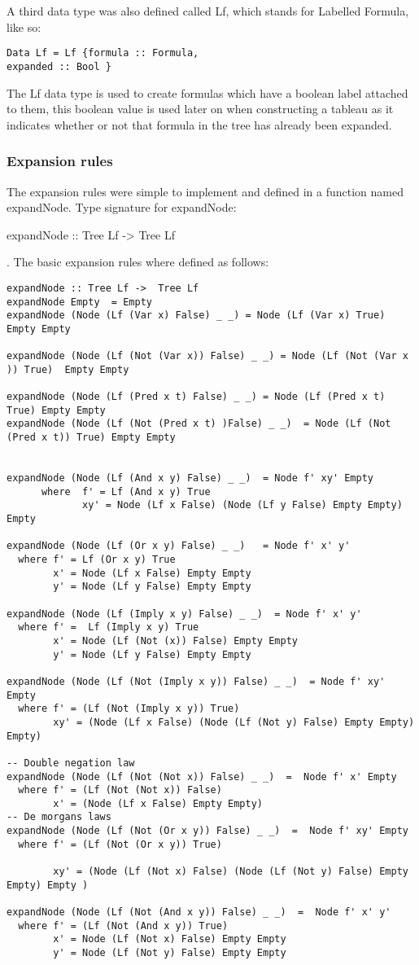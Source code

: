 \documentclass{article}%
\begin{document}
A third data type was also defined called Lf, which stands for Labelled Formula, like so: 
\begin{verbatim}
Data Lf = Lf {formula :: Formula, 
expanded :: Bool } 
\end{verbatim} 
The Lf data type is used to create formulas which have a boolean label attached to them, this boolean value is used later on when constructing a tableau as it indicates whether or not that formula in the tree has already been expanded. 
\subsubsection{Expansion rules}
The expansion rules were simple to implement and defined in a function named expandNode. Type signature for expandNode: \begin{myFunctionStyle} expandNode :: Tree Lf -> Tree Lf  \end{myFunctionStyle}.
The basic expansion rules where defined as follows: 
\begin{verbatim}
expandNode :: Tree Lf ->  Tree Lf 
expandNode Empty  = Empty 
expandNode (Node (Lf (Var x) False) _ _) = Node (Lf (Var x) True) Empty Empty 

expandNode (Node (Lf (Not (Var x)) False) _ _) = Node (Lf (Not (Var x )) True)  Empty Empty 

expandNode (Node (Lf (Pred x t) False) _ _) = Node (Lf (Pred x t) True) Empty Empty
expandNode (Node (Lf (Not (Pred x t) )False) _ _)  = Node (Lf (Not (Pred x t)) True) Empty Empty


expandNode (Node (Lf (And x y) False) _ _)  = Node f' xy' Empty 
      where  f' = Lf (And x y) True
             xy' = Node (Lf x False) (Node (Lf y False) Empty Empty) Empty
 
expandNode (Node (Lf (Or x y) False) _ _)   = Node f' x' y'
  where f' = Lf (Or x y) True
        x' = Node (Lf x False) Empty Empty
        y' = Node (Lf y False) Empty Empty

expandNode (Node (Lf (Imply x y) False) _ _)  = Node f' x' y'
  where f' =  Lf (Imply x y) True 
        x' = Node (Lf (Not (x)) False) Empty Empty
        y' = Node (Lf y False) Empty Empty 

expandNode (Node (Lf (Not (Imply x y)) False) _ _)  = Node f' xy' Empty 
  where f' = (Lf (Not (Imply x y)) True)
        xy' = (Node (Lf x False) (Node (Lf (Not y) False) Empty Empty) Empty)    

-- Double negation law
expandNode (Node (Lf (Not (Not x)) False) _ _)  =  Node f' x' Empty
  where f' = (Lf (Not (Not x)) False)  
        x' = (Node (Lf x False) Empty Empty) 
-- De morgans laws
expandNode (Node (Lf (Not (Or x y)) False) _ _)  =  Node f' xy' Empty
  where f' = (Lf (Not (Or x y)) True)
        
        xy' = (Node (Lf (Not x) False) (Node (Lf (Not y) False) Empty Empty) Empty )

expandNode (Node (Lf (Not (And x y)) False) _ _)  =  Node f' x' y'
  where f' = (Lf (Not (And x y)) True) 
        x' = Node (Lf (Not x) False) Empty Empty
        y' = Node (Lf (Not y) False) Empty Empty
\end{verbatim}
\end{document}
